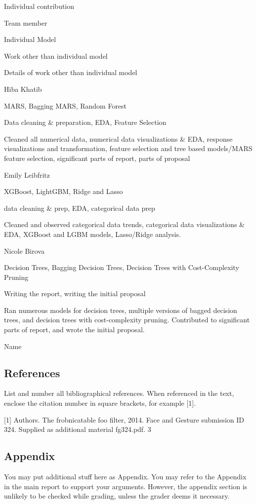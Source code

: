 \documentclass[
  letterpaper,
  DIV=11,
  numbers=noendperiod]{scrartcl}
\begin{document}
Individual contribution

Team member

Individual Model

Work other than individual model

Details of work other than individual model

Hiba Khatib

MARS, Bagging MARS, Random Forest

Data cleaning \& preparation, EDA, Feature Selection

Cleaned all numerical data, numerical data visualizations \& EDA,
response visualizations and transformation, feature selection and tree
based models/MARS feature selection, significant parts of report, parts
of proposal

Emily Leibfritz

XGBoost, LightGBM, Ridge and Lasso

data cleaning \& prep, EDA, categorical data prep

Cleaned and observed categorical data trends, categorical data
visualizations \& EDA, XGBoost and LGBM models, Lasso/Ridge analysis.

Nicole Birova

Decision Trees, Bagging Decision Trees, Decision Trees with
Cost-Complexity Pruning

Writing the report, writing the initial proposal

Ran numerous models for decision trees, multiple versions of bagged
decision trees, and decision trees with cost-complexity pruning.
Contributed to significant parts of report, and wrote the initial
proposal.

Name

\hypertarget{references}{%
\subsection*{References}\label{references}}

List and number all bibliographical references. When referenced in the
text, enclose the citation number in square brackets, for example
{[}1{]}.

{[}1{]} Authors. The frobnicatable foo filter, 2014. Face and Gesture
submission ID 324. Supplied as additional material fg324.pdf. 3

\hypertarget{appendix}{%
\subsection*{Appendix}\label{appendix}}

You may put additional stuff here as Appendix. You may refer to the
Appendix in the main report to support your arguments. However, the
appendix section is unlikely to be checked while grading, unless the
grader deems it necessary.
\end{document}

